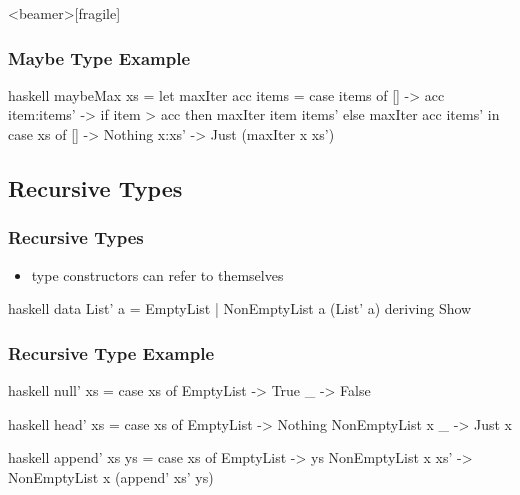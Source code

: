 \documentclass[dvipsnames]{beamer}
\theoremstyle{plain}
\begin{document}
\begin{frame}<beamer>[fragile]
  \frametitle{Maybe Type Example}

  \begin{example}
    \begin{pygments}{haskell}
maybeMax xs =
    let
       maxIter acc items =
           case items of
             [] -> acc
             item:items' -> if item > acc
                            then maxIter item items'
                            else maxIter acc items'
    in
        case xs of
          [] -> Nothing
          x:xs' -> Just (maxIter x xs')
    \end{pygments}
  \end{example}
\end{frame}

\subsection{Recursive Types}

\begin{frame}[fragile]
  \frametitle{Recursive Types}

  \begin{itemize}
    \item type constructors can refer to themselves
  \end{itemize}

  \pause
  \begin{example}[Haskell]
    \begin{pygments}{haskell}
data List' a = EmptyList | NonEmptyList a (List' a)
               deriving Show
    \end{pygments}
  \end{example}
\end{frame}

\begin{frame}[fragile]
  \frametitle{Recursive Type Example}

  \begin{example}[Haskell]
    \begin{pygments}{haskell}
null' xs =
    case xs of
      EmptyList -> True
      _ -> False
    \end{pygments}

    \pause
    \smallskip
    \begin{pygments}{haskell}
head' xs =
    case xs of
      EmptyList -> Nothing
      NonEmptyList x _ -> Just x
    \end{pygments}

    \pause
    \smallskip
    \begin{pygments}{haskell}
append' xs ys =
    case xs of
      EmptyList -> ys
      NonEmptyList x xs' -> NonEmptyList x (append' xs' ys)
    \end{pygments}
  \end{example}
\end{frame}
\end{document}
